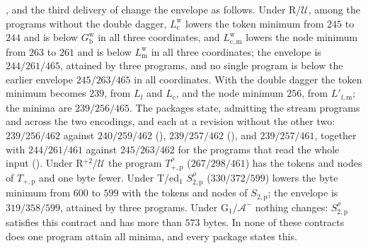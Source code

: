,  and the third
delivery of  change the envelope as follows. Under
R/$\mathcal U$, among the programs without the double dagger,
$L^{\mathrm w}_{\mathrm c}$ lowers the token minimum from $245$ to $244$ and is
below $G^{\mathrm w}_{\mathrm b}$ in all three coordinates, and
$L^{\mathrm w}_{\mathrm{c,m}}$ lowers the node minimum from $263$ to $261$ and is
below $L^{\mathrm w}_{\mathrm m}$ in all three coordinates; the envelope is
$244/261/465$, attained by three programs, and no single program is below the
earlier envelope $245/263/465$ in all coordinates. With the double dagger the token
minimum becomes $239$, from $L_{\mathrm f}$ and $L_{\mathrm c}$, and the node
minimum $256$, from $L'_{\mathrm{f,m}}$; the minima are $239/256/465$. The packages
state, admitting the stream programs and across the two encodings, and each at a
revision without the other two: $239/256/462$ against $240/259/462$
(), $239/257/462$ (),
and $239/257/461$, together with $244/261/461$ against $245/263/462$ for the
programs that read the whole input (). Under
R$^{+2}$/$\mathcal U$ the program $T^{\rho}_{+,\mathrm p}$ ($267/298/461$) has the
tokens and nodes of $T_{+,\mathrm p}$ and one byte fewer. Under T/ed$_1$
$S^{\rho}_{2,\mathrm p}$ ($330/372/599$) lowers the byte minimum from $600$ to
$599$ with the tokens and nodes of $S_{2,\mathrm p}$; the envelope is
$319/358/599$, attained by three programs. Under G$_1$/$\mathcal A^{-}$ nothing
changes: $S^{\rho}_{2,\mathrm p}$ satisfies this contract and has more than $573$
bytes. In none of these contracts does one program attain all minima, and every
package states this.

